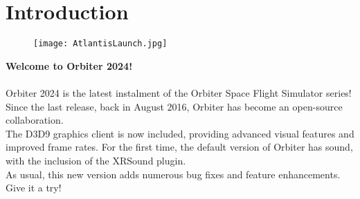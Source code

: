 \documentclass[Orbiter User Manual.tex]{subfiles}
\begin{document}
\section{Introduction}

\begin{figure}[H]
  \centering
  \texttt{[image: AtlantisLaunch.jpg]}
\end{figure}

\textbf{Welcome to Orbiter 2024!}\\
\\
Orbiter 2024 is the latest instalment of the Orbiter Space Flight Simulator series!\\
Since the last release, back in August 2016, Orbiter has become an open-source collaboration.\\
The D3D9 graphics client is now included, providing advanced visual features and improved frame rates. For the first time, the default version of Orbiter has sound, with the inclusion of the XRSound plugin.\\
As usual, this new version adds numerous bug fixes and feature enhancements. Give it a try!\\

\newpage
\end{document}

